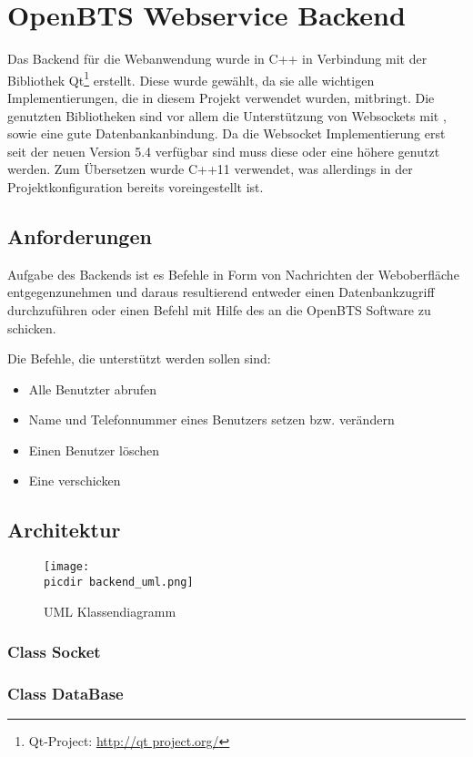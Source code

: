 \section{OpenBTS Webservice Backend}

Das Backend für die Webanwendung wurde in C++ in Verbindung mit der Bibliothek Qt\footnote{Qt-Project: \url{http://qt project.org/}} erstellt. Diese wurde gewählt, da sie alle wichtigen Implementierungen, die in diesem Projekt verwendet wurden, mitbringt. Die genutzten Bibliotheken sind vor allem die Unterstützung von Websockets mit \JSON, sowie eine gute Datenbankanbindung. Da die Websocket Implementierung erst seit der neuen Version 5.4 verfügbar sind muss diese oder eine höhere genutzt werden. Zum Übersetzen wurde C++11 verwendet, was allerdings in der Projektkonfiguration bereits voreingestellt ist.

\subsection{Anforderungen}

Aufgabe des Backends ist es Befehle in Form von \JSON Nachrichten der Weboberfläche entgegenzunehmen und daraus resultierend entweder einen Datenbankzugriff durchzuführen oder einen Befehl mit Hilfe des \CLI an die OpenBTS Software zu schicken.

Die Befehle, die unterstützt werden sollen sind:

\begin{itemize}
	\item Alle Benutzter abrufen
	\item Name und Telefonnummer eines Benutzers setzen bzw. verändern
	\item Einen Benutzer löschen
	\item Eine \SMS verschicken
\end{itemize}

\subsection{Architektur}

\begin{figure}[h!]
	\centering
	\texttt{[image: \\picdir backend\_uml.png]}
	\caption{UML Klassendiagramm}
	\label{uml_class}
\end{figure}

\subsubsection{Class Socket}

\subsubsection{Class DataBase}
